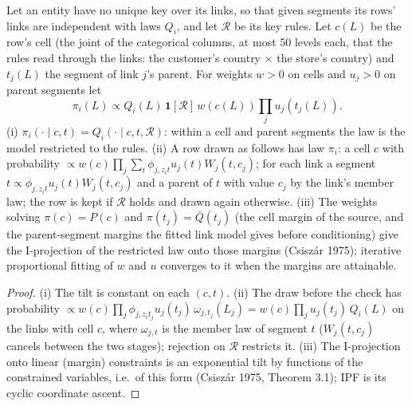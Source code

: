 \begin{proposition}\label{prop:rake}
Let an entity have no unique key over its links, so that given segments its rows' links are independent with laws $Q_i$, and let $\mathcal R$ be its key rules. Let $c(L)$ be the row's cell (the joint of the categorical columns, at most 50 levels each, that the rules read through the links: the customer's country $\times$ the store's country) and $t_j(L)$ the segment of link $j$'s parent. For weights $w>0$ on cells and $u_j>0$ on parent segments let
\[\pi_i(L)\propto Q_i(L)\,\mathbf 1[\mathcal R]\,w(c(L))\prod_j u_j(t_j(L)).\]
(i) $\pi_i(\cdot\mid c,t)=Q_i(\cdot\mid c,t,\mathcal R)$: within a cell and parent segments the law is the model restricted to the rules. (ii) A row drawn as follows has law $\pi_i$: a cell $c$ with probability $\propto w(c)\prod_j\sum_t\phi_{j,z_it}u_j(t)W_j(t,c_j)$; for each link a segment $t\propto\phi_{j,z_it}u_j(t)W_j(t,c_j)$ and a parent of $t$ with value $c_j$ by the link's member law; the row is kept if $\mathcal R$ holds and drawn again otherwise. (iii) The weights solving $\pi(c)=P(c)$ and $\pi(t_j)=\bar Q(t_j)$ (the cell margin of the source, and the parent-segment margins the fitted link model gives before conditioning) give the I-projection of the restricted law onto those margins (Csisz\'ar 1975); iterative proportional fitting of $w$ and $u$ converges to it when the margins are attainable.
\end{proposition}
\begin{proof}
(i) The tilt is constant on each $(c,t)$. (ii) The draw before the check has probability $\propto w(c)\prod_j\phi_{j,z_it_j}u_j(t_j)\,\omega_{j,t_j}(L_j)=w(c)\prod_ju_j(t_j)\,Q_i(L)$ on the links with cell $c$, where $\omega_{j,t}$ is the member law of segment $t$ ($W_j(t,c_j)$ cancels between the two stages); rejection on $\mathcal R$ restricts it. (iii) The I-projection onto linear (margin) constraints is an exponential tilt by functions of the constrained variables, i.e.\ of this form (Csisz\'ar 1975, Theorem 3.1); IPF is its cyclic coordinate ascent.
\end{proof}

